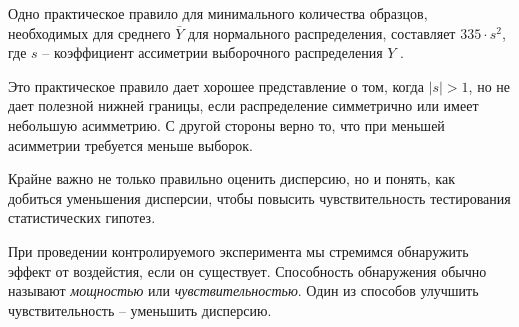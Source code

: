 \documentclass[%
	11pt,
	a4paper,
	utf8,
		]{article}
\begin{document}
Одно практическое правило для минимального количества образцов, необходимых для среднего $\bar{Y}$ для нормального распределения, составляет $335 \cdot s^2$, где $s$ -- коэффициент ассиметрии выборочного распределения $Y$ \cite[]{kohavi:ab-tests-2021}.

Это практическое правило дает хорошее представление о том, когда $|s| > 1$, но не дает полезной нижней границы, если распределение симметрично или имеет небольшую асимметрию. С другой стороны верно то, что при меньшей асимметрии требуется меньше выборок.

Крайне важно не только правильно оценить дисперсию, но и понять, как добиться уменьшения дисперсии, чтобы повысить чувствительность тестирования статистических гипотез.

При проведении контролируемого эксперимента мы стремимся обнаружить эффект от воздейстия, если он существует. Способность обнаружения обычно называют \emph{мощностью} или \emph{чувствительностью}. Один из способов улучшить чувствительность -- уменьшить дисперсию.









\begin{thebibliography}{99}
	
\end{thebibliography}


\end{document}
